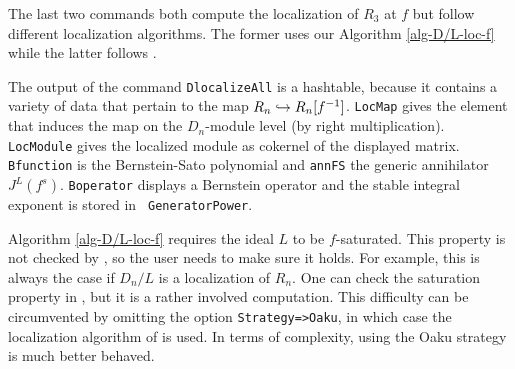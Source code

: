 \begin{example}
The last two commands  both compute the localization of
$R_3$ 
at $f$ but follow different localization algorithms. The
former uses our Algorithm \ref{alg-D/L-loc-f} while the latter follows
\cite{DM:O-T-W}. 

The output of the command {\tt DlocalizeAll} is a hashtable, because
it contains a variety of data that pertain to the map $R_n\hookrightarrow
R_n[f^{-1}]$. {\tt LocMap} gives the element that induces the map on
the $D_n$-module level (by right multiplication). {\tt LocModule} gives
the localized module as cokernel of the displayed matrix. {\tt
Bfunction} is the Bernstein-Sato polynomial and {\tt annFS} the
generic annihilator $J^L(f^s)$. {\tt Boperator} displays a
Bernstein operator and the stable integral exponent is stored in {\tt
GeneratorPower}. 

Algorithm \ref{alg-D/L-loc-f} requires the ideal $L$ to be
$f$-saturated. This property is not checked by \Mtwo, so the user
needs to make sure it holds. For example, this is always the case if
$D_n/L$ is a localization of $R_n$. One can check the saturation
property in \Mtwo, but it is a rather involved computation. This difficulty can
be circumvented by omitting the option {\tt Strategy=>Oaku}, in
which case the localization algorithm of \cite{DM:O-T-W} is used. In
terms of complexity, using the Oaku strategy is much better behaved.


\end{example}
